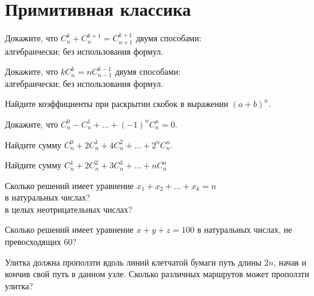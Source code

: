 

\section*{Примитивная классика}


\begin{problems}

\item
Докажите, что $C_n^k + C_n^{k+1} = C_{n+1}^{k+1}$ двумя способами:
\\
\sbp алгебраически;
\quad
\sbp без использования формул.

\item
Докажите, что $k C_n^k = n C_{n-1}^{k-1}$  двумя способами:
\\
\sbp алгебраически;
\quad
\sbp без использования формул.

\item
Найдите коэффициенты при раскрытии скобок в выражении $(a + b)^n$.

\item
Докажите, что $C_n^0 - C_n^1 + \ldots + (-1)^n C_n^n = 0$.

\item
Найдите сумму $C_n^0 + 2 C_n^1 + 4 C_n^2 + \ldots + 2^n C_n^n$.

\item
Найдите сумму $C_n^1 + 2 C_n^2 + 3 C_n^3 + \ldots + n C_n^n$

\item
Сколько решений имеет уравнение $x_1 + x_2 + \ldots + x_k = n$
\\
\sbp в натуральных числах?
\\
\sbp в целых неотрицательных числах?

\item
Сколько решений имеет уравнение $x + y + z = 100$ в натуральных числах,
не превосходящих $60$?
 
\item
Улитка должна проползти вдоль линий клетчатой бумаги путь длины $2 n$, начав и кончив
свой путь в данном узле.
Сколько различных маршрутов может проползти улитка?
 
\end{problems}

